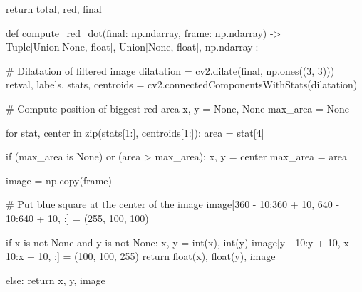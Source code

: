 \begin{pyverbatim}
    return total, red, final


def compute_red_dot(final: np.ndarray, frame: np.ndarray) -> Tuple[Union[None, float], Union[None, float], np.ndarray]:

    # Dilatation of filtered image
    dilatation = cv2.dilate(final, np.ones((3, 3)))
    retval, labels, stats, centroids = cv2.connectedComponentsWithStats(dilatation)

    # Compute position of biggest red area
    x, y = None, None
    max_area = None

    for stat, center in zip(stats[1:], centroids[1:]):
        area = stat[4]

        if (max_area is None) or (area > max_area):
            x, y = center
            max_area = area

    image = np.copy(frame)

    # Put blue square at the center of the image
    image[360 - 10:360 + 10, 640 - 10:640 + 10, :] = (255, 100, 100)

    if x is not None and y is not None:
        x, y = int(x), int(y)
        image[y - 10:y + 10, x - 10:x + 10, :] = (100, 100, 255)
        return float(x), float(y), image

    else:
        return x, y, image

\end{pyverbatim}


